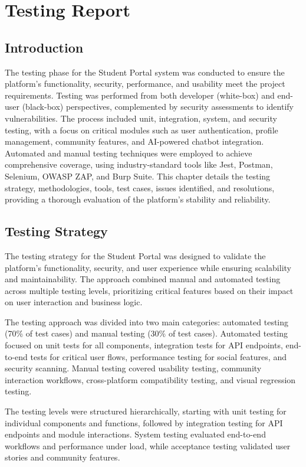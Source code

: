 
\chapter{Testing Report}

\section{Introduction}
The testing phase for the Student Portal system was conducted to ensure the platform's functionality, security, performance, and usability meet the project requirements. Testing was performed from both developer (white-box) and end-user (black-box) perspectives, complemented by security assessments to identify vulnerabilities. The process included unit, integration, system, and security testing, with a focus on critical modules such as user authentication, profile management, community features, and AI-powered chatbot integration. Automated and manual testing techniques were employed to achieve comprehensive coverage, using industry-standard tools like Jest, Postman, Selenium, OWASP ZAP, and Burp Suite. This chapter details the testing strategy, methodologies, tools, test cases, issues identified, and resolutions, providing a thorough evaluation of the platform's stability and reliability.

\section{Testing Strategy}
The testing strategy for the Student Portal was designed to validate the platform's functionality, security, and user experience while ensuring scalability and maintainability. The approach combined manual and automated testing across multiple testing levels, prioritizing critical features based on their impact on user interaction and business logic.

The testing approach was divided into two main categories: automated testing (70\% of test cases) and manual testing (30\% of test cases). Automated testing focused on unit tests for all components, integration tests for API endpoints, end-to-end tests for critical user flows, performance testing for social features, and security scanning. Manual testing covered usability testing, community interaction workflows, cross-platform compatibility testing, and visual regression testing.

The testing levels were structured hierarchically, starting with unit testing for individual components and functions, followed by integration testing for API endpoints and module interactions. System testing evaluated end-to-end workflows and performance under load, while acceptance testing validated user stories and community features.

